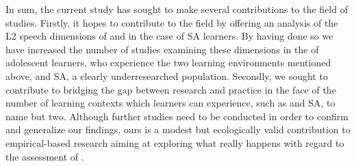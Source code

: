 \documentclass[output=paper]{langsci/langscibook}
\begin{document}
In sum, the current study has sought to make several contributions to the field of  studies. Firstly, it hopes to contribute to the field by offering an analysis of  the {L2} speech dimensions of  and  in the case of SA  learners. By having done so we have increased the number of studies examining these dimensions in the  of adolescent  learners, who experience the two learning environments mentioned above,  and SA, a clearly underresearched population. Secondly, we sought to contribute to bridging the gap between research and  practice in the face of the number of learning contexts which learners can experience, such as  and SA, to name but two. Although further studies need to be conducted in order to confirm and generalize our findings, ours is a modest but ecologically valid contribution to empirical-based research aiming at exploring what really happens with regard to the assessment of .

 
\sloppy
\printbibliography[heading=subbibliography,notkeyword=this] 
\end{document}

